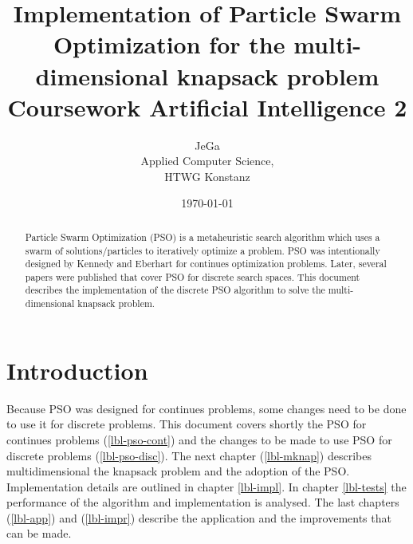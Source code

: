 \documentclass{article}
\begin{document}
\title{Implementation of Particle Swarm Optimization for the multi-dimensional knapsack problem \\
\vspace{2 mm} {\large Coursework Artificial Intelligence 2}}
\author{JeGa\\
        Applied Computer Science,\\
		HTWG Konstanz}
\date{\today}
\maketitle

\begin{abstract}
Particle Swarm Optimization (PSO) is a metaheuristic search algorithm which uses a swarm of solutions/particles to iteratively optimize a problem. PSO was intentionally designed by Kennedy and Eberhart \cite{bib-continues} for continues optimization problems. Later, several papers were published that cover PSO for discrete search spaces. This document describes the implementation of the discrete PSO algorithm to solve the multi-dimensional knapsack problem.
\end{abstract}

\newpage
\cfoot[\thepage]{}

\tableofcontents

\newpage

\section{Introduction}
\label{lbl-intro}
Because PSO was designed for continues problems, some changes need to be done to use it for discrete problems. This document covers shortly the PSO for continues problems (\ref{lbl-pso-cont}) and the changes to be made to use PSO for discrete problems (\ref{lbl-pso-disc}). The next chapter (\ref{lbl-mknap}) describes multidimensional the knapsack problem and the adoption of the PSO.
Implementation details are outlined in chapter \ref{lbl-impl}. In chapter \ref{lbl-tests} the performance of the algorithm and implementation is analysed. The last chapters (\ref{lbl-app}) and (\ref{lbl-impr}) describe the application and the improvements that can be made.
\end{document}
